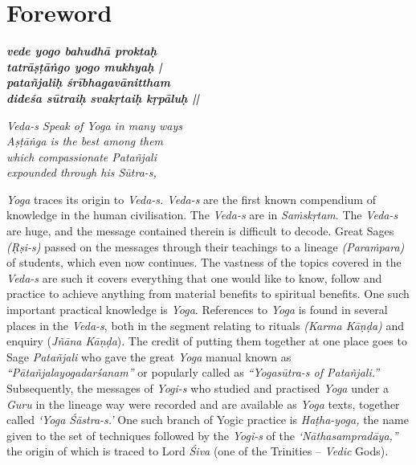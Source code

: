 \thispagestyle{empty}

\chapter*{Foreword}

\begin{shloka}
\centering
\noindent
 \emph{\textbf{vede yogo bahudhā proktaḥ}}\\
 \emph{\textbf{tatrāṣṭāṅgo yogo mukhyaḥ |}}\\
 \emph{\textbf{patañjaliḥ śrībhagavānittham}}\\
 \emph{\textbf{dideśa sūtraiḥ svakṛtaiḥ kṛpāluḥ ||}}
\smallskip

\textit{Veda-s Speak of Yoga in many ways}\\
\textit{Aṣṭāṅga is the best among them}\\
\textit{which compassionate Patañjali}\\
\textit{expounded through his Sūtra-s,}
\end{shloka}

\noindent \textit{Yoga} traces its origin to \textit{Veda-s. Veda-s} are the first known compendium of knowledge in the human civilisation.  The \textit{Veda-s} are in \textit{Saṁskṛtam}. The \textit{Veda-s} are huge, and the message contained therein is difficult to decode. Great Sages \textit{(Ṛṣi-s)} passed on the messages through their teachings to a lineage \textit{(Paraṁpara)} of students, which even now continues. The vastness of the topics covered in the \textit{Veda-s} are such it covers everything that one would like to know, follow and practice to achieve anything from material benefits to spiritual benefits. One such important practical knowledge is \textit{Yoga}.  References to \textit{Yoga} is found in several places in the \textit{Veda-s}, both in the segment relating to rituals \textit{(Karma Kāṇḍa)} and enquiry (\textit{Jñāna Kāṇḍa}). The credit of putting them together at one place goes to Sage \textit{Patañjali} who gave the great \textit{Yoga} manual known as \textit{“Pātañjalayogadarśanam”} or popularly called as \textit{“Yogasūtra-s of Patañjali.”} Subsequently, the messages of \textit{Yogi-s} who studied and practised \textit{Yoga} under a \textit{Guru} in the lineage way were recorded and are available as \textit{Yoga} texts, together called \textit{‘Yoga Śāstra-s.’}  One such branch of Yogic practice is \textit{Haṭha-yoga,} the name given to the set of techniques followed by the \textit{Yogi-s} of the \textit{‘Nāthasampradāya,”} the origin of which is traced to Lord \textit{Śiva} (one of the Trinities – \textit{Vedic} Gods).

